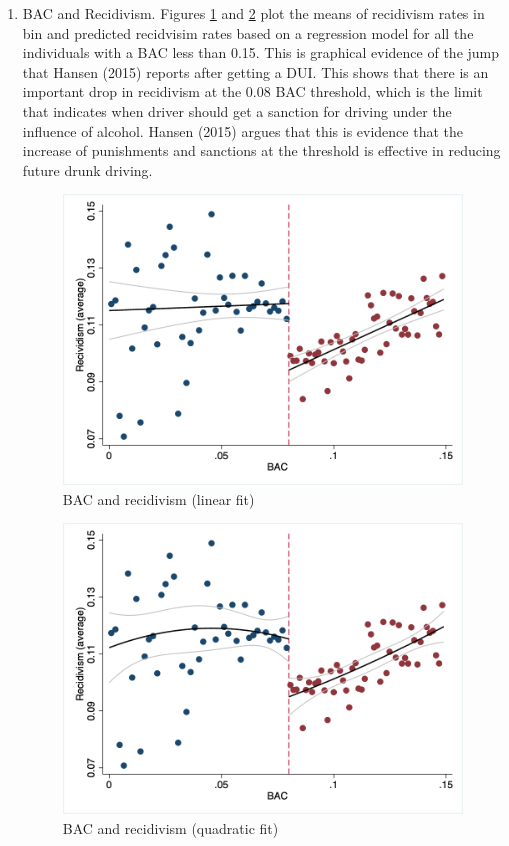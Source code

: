 \documentclass[11pt]{article}\usepackage[]{graphicx}\usepackage[]{color}
\begin{document}
\begin{enumerate}
\newpage
\item BAC and Recidivism.
Figures \ref{figure3_lfit} and \ref{figure3_qfit} plot the means of recidivism rates in bin and predicted recidvisim rates based on a regression model for all the individuals with a BAC less than 0.15. This is graphical evidence of the jump that Hansen (2015) reports after getting a DUI. This shows that there is an important drop in recidivism at the 0.08 BAC threshold, which is the limit that indicates when driver should get a sanction for driving under the influence of alcohol. Hansen (2015) argues that this is evidence that the increase of punishments and sanctions at the threshold is effective in reducing future drunk driving.
 
  \begin{figure}[!htb]
  \caption{BAC and recidivism (linear fit)}
  \label{figure3_lfit}
 \centering
  \includegraphics[scale=1]{figure3_lfit}
 \end{figure}
 
  \begin{figure}[!htb]
  \caption{BAC and recidivism (quadratic fit)}
  \label{figure3_qfit}
 \centering
  \includegraphics[scale=1]{figure3_qfit}
 \end{figure}
  
 \end{enumerate}
\end{document}
